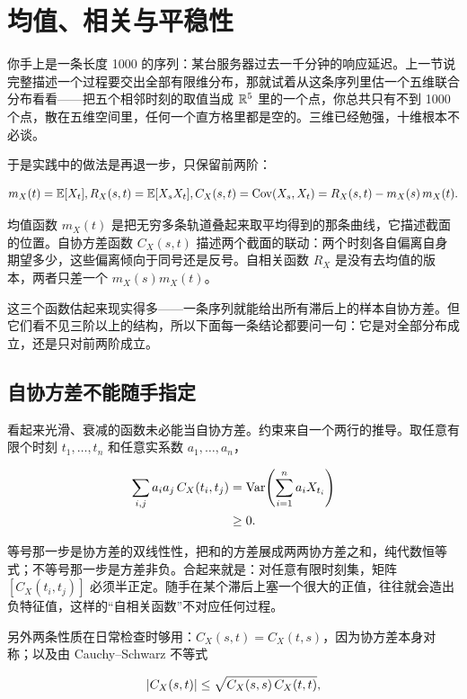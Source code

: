 \section{均值、相关与平稳性}
\label{sec:06-Random-Processes/01-Foundations/03}

你手上是一条长度 1000 的序列：某台服务器过去一千分钟的响应延迟。上一节说完整描述一个过程要交出全部有限维分布，那就试着从这条序列里估一个五维联合分布看看——把五个相邻时刻的取值当成 \(\mathbb{R}^5\) 里的一个点，你总共只有不到 1000 个点，散在五维空间里，任何一个直方格里都是空的。三维已经勉强，十维根本不必谈。

于是实践中的做法是再退一步，只保留前两阶：

\[
m_X(t) = \mathbb{E}[X_t],
\space
R_X(s,t) = \mathbb{E}[X_s X_t],
\space
C_X(s,t) = \operatorname{Cov}(X_s, X_t) = R_X(s,t) - m_X(s)\,m_X(t).
\]

均值函数 \(m_X(t)\) 是把无穷多条轨道叠起来取平均得到的那条曲线，它描述截面的位置。自协方差函数 \(C_X(s,t)\) 描述两个截面的联动：两个时刻各自偏离自身期望多少，这些偏离倾向于同号还是反号。自相关函数 \(R_X\) 是没有去均值的版本，两者只差一个 \(m_X(s)m_X(t)\)。

这三个函数估起来现实得多——一条序列就能给出所有滞后上的样本自协方差。但它们看不见三阶以上的结构，所以下面每一条结论都要问一句：它是对全部分布成立，还是只对前两阶成立。

\subsection{自协方差不能随手指定}

看起来光滑、衰减的函数未必能当自协方差。约束来自一个两行的推导。取任意有限个时刻 \(t_1,\ldots,t_n\) 和任意实系数 \(a_1,\ldots,a_n\)，

\[
\begin{aligned}
\sum_{i,j} a_i a_j\, C_X(t_i,t_j)
&= \operatorname{Var}\!\left(\sum_{i=1}^{n} a_i X_{t_i}\right)\\
&\ge 0.
\end{aligned}
\]

等号那一步是协方差的双线性性，把和的方差展成两两协方差之和，纯代数恒等式；不等号那一步是方差非负。合起来就是：对任意有限时刻集，矩阵 \([C_X(t_i,t_j)]\) 必须半正定。随手在某个滞后上塞一个很大的正值，往往就会造出负特征值，这样的``自相关函数''不对应任何过程。

另外两条性质在日常检查时够用：\(C_X(s,t)=C_X(t,s)\)，因为协方差本身对称；以及由 Cauchy--Schwarz 不等式

\[
\left|C_X(s,t)\right| \le \sqrt{C_X(s,s)\,C_X(t,t)},
\]

